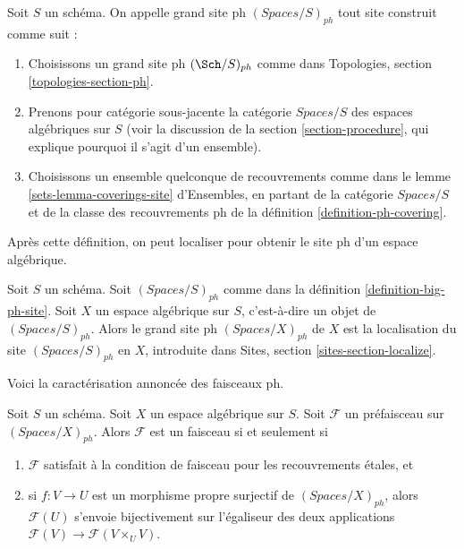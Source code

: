 \begin{definition}
\label{definition-big-ph-site}
Soit $S$ un schéma. On appelle grand site ph {\it $(\textit{Spaces}/S)_{ph}$}
tout site construit comme suit :
\begin{enumerate}
\item Choisissons un grand site ph $(\Sch/S)_{ph}$ comme dans
Topologies, section \ref{topologies-section-ph}.
\item Prenons pour catégorie sous-jacente la catégorie $\textit{Spaces}/S$
des espaces algébriques sur $S$ (voir la discussion de la
section \ref{section-procedure}, qui explique pourquoi il s'agit d'un ensemble).
\item Choisissons un ensemble quelconque de recouvrements comme dans le
lemme \ref{sets-lemma-coverings-site} d'Ensembles, en partant de la
catégorie $\textit{Spaces}/S$ et de la classe des recouvrements ph
de la définition \ref{definition-ph-covering}.
\end{enumerate}
\end{definition}

\noindent
Après cette définition, on peut localiser pour obtenir le site ph
d'un espace algébrique.

\begin{definition}
\label{definition-big-small-ph}
Soit $S$ un schéma. Soit $(\textit{Spaces}/S)_{ph}$ comme dans la
définition \ref{definition-big-ph-site}.
Soit $X$ un espace algébrique sur $S$, c'est-à-dire un objet de
$(\textit{Spaces}/S)_{ph}$. Alors le grand site ph
{\it $(\textit{Spaces}/X)_{ph}$} de $X$
est la localisation du site $(\textit{Spaces}/S)_{ph}$
en $X$, introduite dans Sites, section \ref{sites-section-localize}.
\end{definition}

\noindent
Voici la caractérisation annoncée des faisceaux ph.

\begin{lemma}
\label{lemma-characterize-sheaf}
Soit $S$ un schéma. Soit $X$ un espace algébrique sur $S$.
Soit $\mathcal{F}$ un préfaisceau sur $(\textit{Spaces}/X)_{ph}$.
Alors $\mathcal{F}$ est un faisceau si et seulement si
\begin{enumerate}
\item $\mathcal{F}$ satisfait à la condition de faisceau pour les recouvrements \'etales, et
\item si $f : V \to U$ est un morphisme propre surjectif de
$(\textit{Spaces}/X)_{ph}$, alors
$\mathcal{F}(U)$ s'envoie bijectivement sur l'égaliseur
des deux applications $\mathcal{F}(V) \to \mathcal{F}(V \times_U V)$.
\end{enumerate}
\end{lemma}

